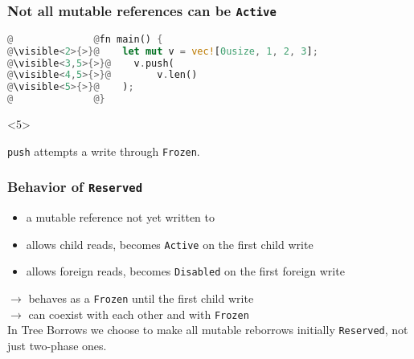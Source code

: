 \begin{frame}[fragile, t]
    \frametitle{Not all mutable references can be \texttt{Active}}
    \begin{block}{}
        \begin{lstlisting}[language=rust, escapechar=\@]
@              @fn main() {
@\visible<2>{>}@    let mut v = vec![0usize, 1, 2, 3];
@\visible<3,5>{>}@    v.push(
@\visible<4,5>{>}@        v.len()
@\visible<5>{>}@    );
@              @}
        \end{lstlisting}
    \end{block}
    \begin{block}{}
    \end{block}
    \begin{onlyenv}<5>
        \begin{block}{}
            \texttt{push} attempts a write through \texttt{Frozen}.
        \end{block}
    \end{onlyenv}
\end{frame}

\begin{frame}
    \frametitle{Behavior of \texttt{Reserved}}
    \begin{itemize}
        \item a mutable reference not yet written to
        \item allows child reads, becomes \texttt{Active} on the first child write
        \item allows foreign reads, becomes \texttt{Disabled} on the first foreign write
    \end{itemize}
    \(\to\) behaves as a \texttt{Frozen} until the first child write\\
    \(\to\) can coexist with each other and with \texttt{Frozen}\\

    In Tree Borrows we choose to make all mutable reborrows initially \texttt{Reserved},
    not just two-phase ones.
\end{frame}

